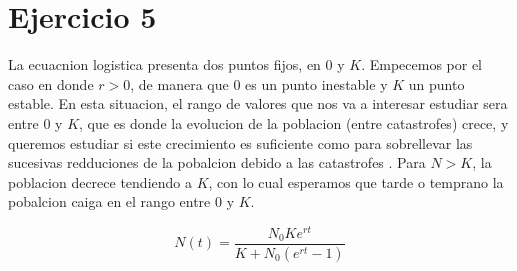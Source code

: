 \section*{Ejercicio 5}
\graphicspath{{Figuras/ej_05/}}

La ecuacnion logistica presenta dos puntos fijos, en $0$ y $K$.
Empecemos por el caso en donde $r > 0$, de manera que $0$ es un punto inestable y $K$ un punto estable. En esta situacion, el rango de valores que nos va a interesar estudiar sera entre 0 y $K$, que es donde la evolucion de la poblacion (entre catastrofes) crece, y queremos estudiar si este crecimiento es suficiente como para sobrellevar las sucesivas redduciones de la pobalcion debido a las catastrofes . Para $N > K$, la poblacion decrece tendiendo a $K$, con lo cual esperamos que tarde o temprano la pobalcion caiga en el rango entre $0$ y $K$.

\begin{equation}
    N(t) = \frac{N_{0} K e^{rt}}{K+N_{0}(e^{rt}-1)}
    \label{eq:Logistica_Sol_Exacta}
\end{equation}

